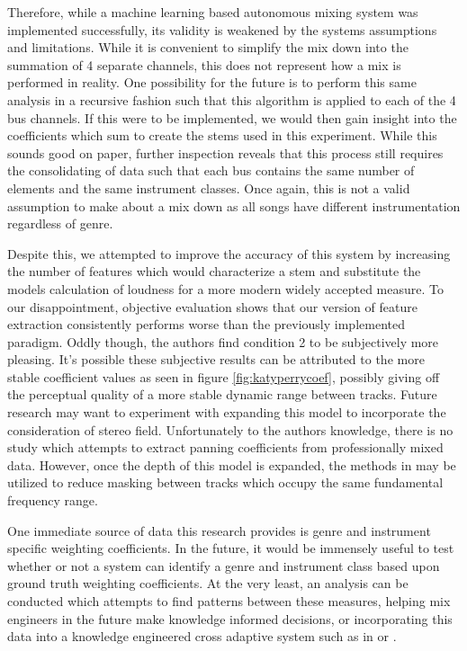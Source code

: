 \documentclass{article}
\begin{document}
Therefore, while a machine learning based autonomous mixing system was implemented successfully, its validity is weakened by the systems assumptions and limitations. While it is convenient to simplify the mix down into the summation of 4 separate channels, this does not represent how a mix is performed in reality.  One possibility for the future is to perform this same analysis in a recursive fashion such that this algorithm is applied to each of the 4 bus channels.  If this were to be implemented, we would then gain insight into the coefficients which sum to create the stems used in this experiment.  While this sounds good on paper, further inspection reveals that this process still requires the consolidating of data such that each bus contains the same number of elements and the same instrument classes.  Once again, this is not a valid assumption to make about a mix down as all songs have different instrumentation regardless of genre. 

Despite this, we attempted to improve the accuracy of this system by increasing the number of features which would characterize a stem and substitute the models calculation of loudness for a more modern widely accepted measure.  To our disappointment, objective evaluation shows that our version of feature extraction consistently performs worse than the previously implemented paradigm.  Oddly though, the authors find condition 2 to be subjectively more pleasing.  It's possible these subjective results can be attributed to the more stable coefficient values as seen in figure \ref{fig:katyperrycoef}, possibly giving off the perceptual quality of a more stable dynamic range between tracks.  Future research may want to experiment with expanding this model to incorporate the consideration of stereo field.  Unfortunately to the authors knowledge, there is no study which attempts to extract panning coefficients from professionally mixed data.  However, once the depth of this model is expanded, the methods in \cite{perez2010real} may be utilized to reduce masking between tracks which occupy the same fundamental frequency range.

One immediate source of data this research provides is genre and instrument specific weighting coefficients.  In the future, it would be immensely useful to test whether or not a system can identify a genre and instrument class based upon ground truth weighting coefficients.  At the very least, an analysis can be conducted which attempts to find patterns between these measures, helping mix engineers in the future make knowledge informed decisions, or incorporating this data into a knowledge engineered cross adaptive system such as in \cite{de2013knowledge} or \cite{scott2013instrument}.
\end{document}
